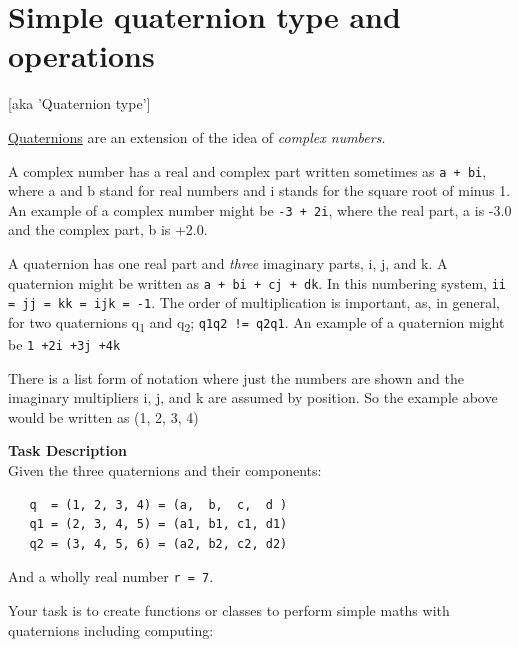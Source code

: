 \pagebreak{}
\section*{Simple quaternion type and operations}
[aka 'Quaternion type']

\href{http://en.wikipedia.org/wiki/Quaternion}{Quaternions} are an
extension of the idea of \emph{complex
numbers}.

A complex number has a real and complex part written sometimes as
\texttt{a + bi}, where a and b stand for real numbers and i stands for
the square root of minus 1. An example of a complex number might be
\texttt{-3 + 2i}, where the real part, a is -3.0 and the complex part, b
is +2.0.

A quaternion has one real part and \emph{three} imaginary parts, i, j,
and k. A quaternion might be written as \texttt{a + bi + cj + dk}. In
this numbering system, \texttt{ii = jj = kk = ijk = -1}. The order of
multiplication is important, as, in general, for two quaternions
q\textsubscript{1} and q\textsubscript{2}; \texttt{q1q2~!= q2q1}. An
example of a quaternion might be \texttt{1 +2i +3j +4k}

There is a list form of notation where just the numbers are shown and
the imaginary multipliers i, j, and k are assumed by position. So the
example above would be written as (1, 2, 3, 4)

\textbf{Task Description}\\ Given the three quaternions and their
components:

\begin{verbatim}
   q  = (1, 2, 3, 4) = (a,  b,  c,  d )
   q1 = (2, 3, 4, 5) = (a1, b1, c1, d1)
   q2 = (3, 4, 5, 6) = (a2, b2, c2, d2)
\end{verbatim}

And a wholly real number \texttt{r = 7}.

Your task is to create functions or classes to perform simple maths with
quaternions including computing:

